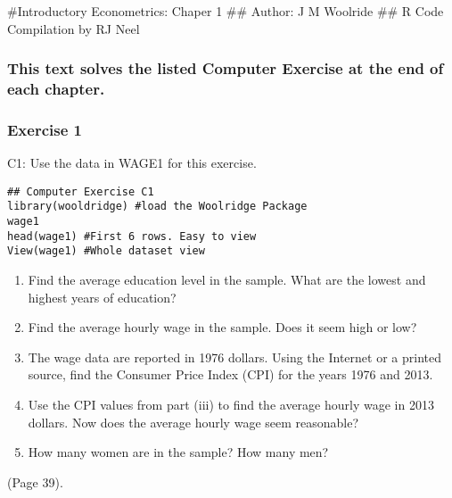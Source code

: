 \documentclass[
]{article}
\author{}
\date{\vspace{-2.5em}}
\begin{document}
\#Introductory Econometrics: Chaper 1 \#\# Author: J M Woolride \#\# R
Code Compilation by RJ Neel

\hypertarget{this-text-solves-the-listed-computer-exercise-at-the-end-of-each-chapter.}{%
\subsubsection{This text solves the listed Computer Exercise at the end
of each
chapter.}\label{this-text-solves-the-listed-computer-exercise-at-the-end-of-each-chapter.}}

\hypertarget{exercise-1}{%
\subsubsection{Exercise 1}\label{exercise-1}}

C1: Use the data in WAGE1 for this exercise.

\begin{verbatim}
## Computer Exercise C1
library(wooldridge) #load the Woolridge Package
wage1
head(wage1) #First 6 rows. Easy to view
View(wage1) #Whole dataset view
\end{verbatim}

\begin{enumerate}
\def\labelenumi{(\roman{enumi})}
\item
  Find the average education level in the sample. What are the lowest
  and highest years of education?
\item
  Find the average hourly wage in the sample. Does it seem high or low?
\item
  The wage data are reported in 1976 dollars. Using the Internet or a
  printed source, find the Consumer Price Index (CPI) for the years 1976
  and 2013.
\item
  Use the CPI values from part (iii) to find the average hourly wage in
  2013 dollars. Now does the average hourly wage seem reasonable?
\item
  How many women are in the sample? How many men?
\end{enumerate}

(Page 39).
\end{document}
